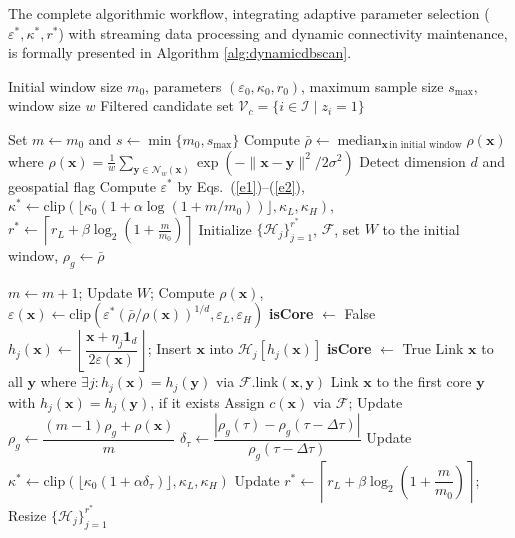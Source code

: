 \documentclass[preprint,12pt,authoryear]{elsarticle}
\theoremstyle{definition}
\begin{document}
The complete algorithmic workflow, integrating adaptive parameter selection ($\varepsilon^*, \kappa^*, r^*$) with streaming data processing and dynamic connectivity maintenance, is formally presented in Algorithm \ref{alg:dynamicdbscan}.



\begin{algorithm}[htbp]
\caption{AD-DBSCAN}
\label{alg:dynamicdbscan}
\begin{algorithmic}[1]
\Require Initial window size $m_0$, parameters $(\varepsilon_0, \kappa_0, r_0)$, maximum sample size $s_{\max}$, window size $w$
\Ensure Filtered candidate set $\mathcal{V}_c = \{i \in \mathcal{I} \mid z_i = 1\}$

\State Set $m \leftarrow m_0$ and $s\leftarrow \min\{m_0,s_{\max}\}$
\State Compute $\bar{\rho} \leftarrow \operatorname{median}_{\bm{x}\,\text{in initial window}} \rho(\bm{x})$ where $\rho(\bm{x}) = \frac{1}{w}\sum_{\bm{y} \in \mathcal{N}_w(\bm{x})} \exp(-\|\bm{x} - \bm{y}\|^2/2\sigma^2)$
\State Detect dimension $d$ and geospatial flag
\State Compute $\varepsilon^*$ by Eqs.~(\ref{e1})--(\ref{e2}), $\kappa^* \leftarrow \text{clip}(\lfloor \kappa_0 (1 + \alpha \log(1+m/m_0)) \rfloor, \kappa_L, \kappa_H)$, $r^* \leftarrow \left\lceil r_L + \beta \log_2\left(1 + \frac{m}{m_0}\right) \right\rceil$
\State Initialize $\{\mathcal{H}_j\}_{j=1}^{r^*}$, $\mathcal{F}$, set $W$ to the initial window, $\rho_g \leftarrow \bar{\rho}$

    \State $m \leftarrow m + 1$; Update $W$; Compute $\rho(\bm{x})$, $\varepsilon(\bm{x}) \leftarrow \text{clip}(\varepsilon^* (\bar{\rho}/\rho(\bm{x}))^{1/d}, \varepsilon_L, \varepsilon_H)$
    \State \textbf{isCore} $\leftarrow$ False
        \State $h_j(\bm{x}) \leftarrow \left\lfloor \dfrac{\bm{x} + \eta_j \mathbf{1}_d}{2\varepsilon(\bm{x})} \right\rfloor$; Insert $\bm{x}$ into $\mathcal{H}_j[h_j(\bm{x})]$
            \State \textbf{isCore} $\leftarrow$ True
        \EndIf
    \EndFor
        \State Link $\bm{x}$ to all $\bm{y}$ where $\exists j: h_j(\bm{x}) = h_j(\bm{y})$ via $\mathcal{F}.\text{link}(\bm{x}, \bm{y})$
    \Else
        \State Link $\bm{x}$ to the first core $\bm{y}$ with $h_j(\bm{x}) = h_j(\bm{y})$, if it exists
    \EndIf
    \State Assign $c(\bm{x})$ via $\mathcal{F}$; Update $\rho_g \leftarrow \dfrac{(m-1)\rho_g + \rho(\bm{x})}{m}$
        \State $\delta_\tau \leftarrow \dfrac{|\rho_g(\tau) - \rho_g(\tau - \Delta\tau)|}{\rho_g(\tau - \Delta\tau)}$
        \State Update $\kappa^* \leftarrow \text{clip}(\lfloor \kappa_0 (1 + \alpha \delta_\tau) \rfloor, \kappa_L, \kappa_H)$
        \State Update $r^* \leftarrow \left\lceil r_L + \beta \log_2\left(1 + \dfrac{m}{m_0}\right) \right\rceil$; Resize $\{\mathcal{H}_j\}_{j=1}^{r^*}$
    \EndIf
\EndFor


\end{algorithmic}
\end{algorithm}
\end{document}
